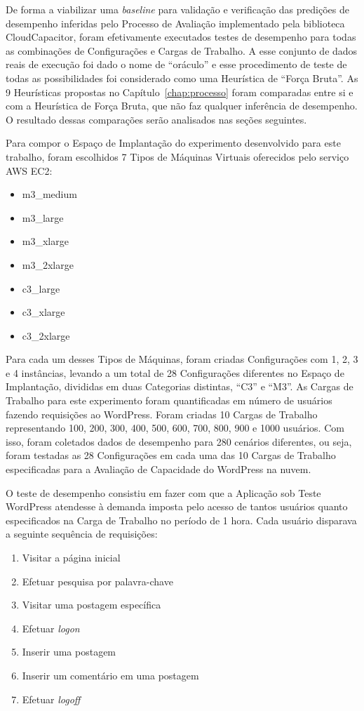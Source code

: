 De forma a viabilizar uma \emph{baseline} para validação e verificação das 
predições de desempenho inferidas pelo Processo de Avaliação implementado pela 
biblioteca CloudCapacitor, foram efetivamente executados testes de desempenho 
para todas as combinações de Configurações e Cargas de Trabalho. A esse conjunto
de dados reais de execução foi dado o nome de ``oráculo'' e esse procedimento
de teste de todas as possibilidades foi considerado como uma Heurística de ``Força
Bruta''. As 9 Heurísticas propostas no Capítulo~\ref{chap:processo} foram comparadas
entre si e com a Heurística de Força Bruta, que não faz qualquer inferência de
desempenho. O resultado dessas comparações serão analisados nas seções seguintes.

Para compor o Espaço de Implantação do experimento desenvolvido para este trabalho, 
foram escolhidos 7 Tipos de Máquinas Virtuais oferecidos pelo serviço AWS EC2:

\begin{itemize}
  \item m3\_medium 
  \item m3\_large
  \item m3\_xlarge
  \item m3\_2xlarge
  \item c3\_large
  \item c3\_xlarge
  \item c3\_2xlarge
\end{itemize}

Para cada um desses Tipos de Máquinas, foram criadas Configurações com 1, 2, 3 e 4
instâncias, levando a um total de 28 Configurações diferentes no Espaço de Implantação,
divididas em duas Categorias distintas, ``C3'' e ``M3''. As Cargas de Trabalho
para este experimento foram quantificadas em número de usuários fazendo
requisições ao WordPress. Foram criadas 10 Cargas de Trabalho representando
100, 200, 300, 400, 500, 600, 700, 800, 900 e 1000 usuários. Com isso, foram
coletados dados de desempenho para 280 cenários diferentes, ou seja, foram 
testadas as 28 Configurações em cada uma das 10 Cargas de Trabalho especificadas 
para a Avaliação de Capacidade do WordPress na nuvem.

O teste de desempenho consistiu em fazer com que a Aplicação sob Teste WordPress
atendesse à demanda imposta pelo acesso de tantos usuários quanto especificados 
na Carga de Trabalho no período de 1 hora. Cada usuário disparava a seguinte
sequência de requisições:

\begin{enumerate}
  \item Visitar a página inicial
  \item Efetuar pesquisa por palavra-chave
  \item Visitar uma postagem específica
  \item Efetuar \emph{logon}
  \item Inserir uma postagem
  \item Inserir um comentário em uma postagem
  \item Efetuar \emph{logoff}
\end{enumerate}


